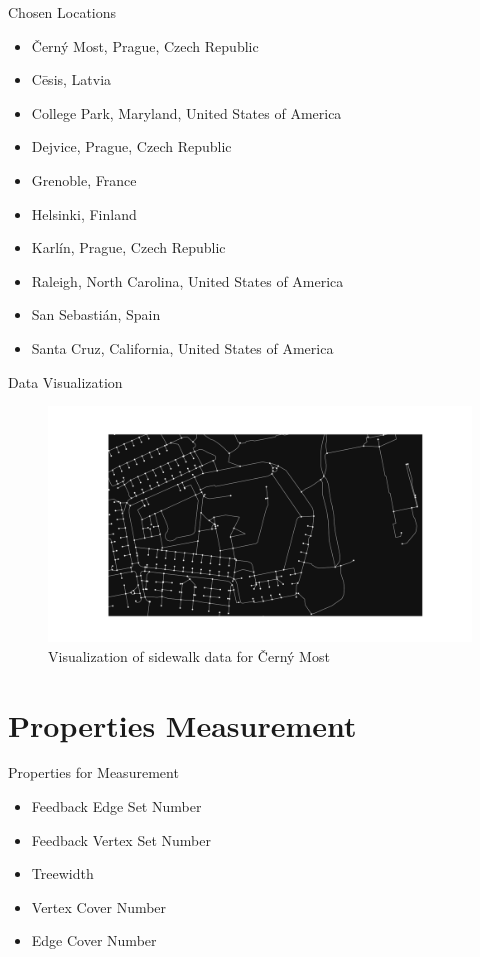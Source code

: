 \documentclass{beamer}
\begin{document}
\begin{frame}[fragile]{Chosen Locations}
    \begin{itemize}
        \item Černý Most, Prague, Czech Republic
        \item Cēsis, Latvia
        \item College Park, Maryland, United States of America
        \item Dejvice, Prague, Czech Republic
        \item Grenoble, France
        \item Helsinki, Finland
        \item Karlín, Prague, Czech Republic
        \item Raleigh, North Carolina, United States of America
        \item San Sebastián, Spain
        \item Santa Cruz, California, United States of America
    \end{itemize}
\end{frame}

\begin{frame}[fragile, t]{Data Visualization}
    \begin{figure}
        \includegraphics[width=1.0\linewidth]{img/cerny_most_visualization.png}
        \caption{Visualization of sidewalk data for Černý Most}
    \end{figure}
\end{frame}

\section{Properties Measurement}
\begin{frame}{Properties for Measurement}
    \begin{itemize}
        \item Feedback Edge Set Number
        \item Feedback Vertex Set Number
        \item Treewidth
        \item Vertex Cover Number
        \item Edge Cover Number
    \end{itemize}
\end{frame}
\end{document}

